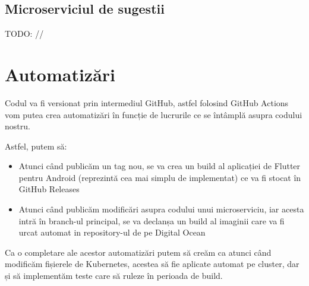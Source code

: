 \subsection{Microserviciul de sugestii}

TODO: //

\section{Automatizări}

Codul va fi versionat prin intermediul GitHub, astfel folosind GitHub Actions vom putea crea
automatizări în funcție de lucrurile ce se întâmplă asupra codului nostru.

Astfel, putem să:

\begin{itemize}
    \item Atunci când publicăm un tag nou, se va crea un build al aplicației de Flutter pentru Android
          (reprezintă cea mai simplu de implementat) ce va fi stocat în GitHub Releases
    \item Atunci când publicăm modificări asupra codului unui microserviciu, iar acesta intră în branch-ul principal,
          se va declanșa un build al imaginii care va fi urcat automat in repository-ul de pe Digital Ocean
\end{itemize}

Ca o completare ale acestor automatizări putem să creăm ca atunci când modificăm
fișierele de Kubernetes, acestea să fie aplicate automat pe cluster, dar și
să implementăm teste care să ruleze în perioada de build.

